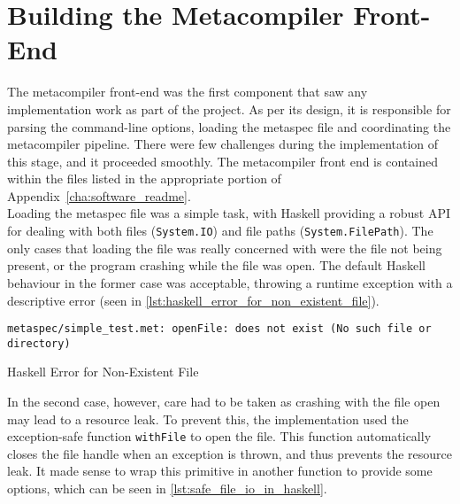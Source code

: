 

\section{Building the Metacompiler Front-End} %
\label{sec:building_the_metacompiler_front_end}
The metacompiler front-end was the first component that saw any implementation work as part of the project. 
As per its design, it is responsible for parsing the command-line options, loading the metaspec file and coordinating the metacompiler pipeline.
There were few challenges during the implementation of this stage, and it proceeded smoothly.
The metacompiler front end is contained within the files listed in the appropriate portion of Appendix~\ref{cha:software_readme}.\\

Loading the metaspec file was a simple task, with Haskell providing a robust API for dealing with both files (\texttt{System.IO}) and file paths (\texttt{System.FilePath}). 
The only cases that loading the file was really concerned with were the file not being present, or the program crashing while the file was open.
The default Haskell behaviour in the former case was acceptable, throwing a runtime exception with a descriptive error (seen in \autoref{lst:haskell_error_for_non_existent_file}).\\

\begin{listing}[!htb]
\begin{verbatim}
metaspec/simple_test.met: openFile: does not exist (No such file or directory)
\end{verbatim}
\caption{Haskell Error for Non-Existent File}
\label{lst:haskell_error_for_non_existent_file}
\end{listing}

In the second case, however, care had to be taken as crashing with the file open may lead to a resource leak. 
To prevent this, the implementation used the exception-safe function \texttt{withFile} to open the file.
This function automatically closes the file handle when an exception is thrown, and thus prevents the resource leak.
It made sense to wrap this primitive in another function to provide some options, which can be seen in \autoref{lst:safe_file_io_in_haskell}.

